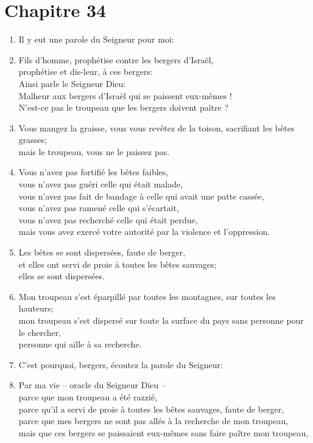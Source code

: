 \documentclass[12pt,a4paper,titlepage]{article}
\def \pslabelsep{0.2em} %
\def \psleftmargin{0em} %
\begin{document}
\section*{Chapitre 34}
\begin{enumerate}[leftmargin=\psleftmargin, labelsep = \pslabelsep, label={\arabic*}, font=\color{\pscolor}\small\textsuperscript, parsep=0em, itemsep=0em, topsep=0em ]
\item Il y eut une parole du Seigneur pour moi:
\item Fils d’homme, prophétise contre les bergers d’Israël, \\ prophétise et dis-leur, à ces bergers: \\ Ainsi parle le Seigneur Dieu: \\ Malheur aux bergers d’Israël qui se paissent eux-mêmes ! \\ N’est-ce pas le troupeau que les bergers doivent paître ?
\item Vous mangez la graisse, vous vous revêtez de la toison, sacrifiant les bêtes grasses; \\ mais le troupeau, vous ne le paissez pas.
\item Vous n’avez pas fortifié les bêtes faibles, \\ vous n’avez pas guéri celle qui était malade, \\ vous n’avez pas fait de bandage à celle qui avait une patte cassée, \\ vous n’avez pas ramené celle qui s’écartait, \\ vous n’avez pas recherché celle qui était perdue, \\ mais vous avez exercé votre autorité par la violence et l’oppression.
\item Les bêtes se sont dispersées, faute de berger, \\ et elles ont servi de proie à toutes les bêtes sauvages; \\ elles se sont dispersées.
\item Mon troupeau s’est éparpillé par toutes les montagnes, sur toutes les hauteurs; \\ mon troupeau s’est dispersé sur toute la surface du pays sans personne pour le chercher, \\ personne qui aille à sa recherche.
\item C’est pourquoi, bergers, écoutez la parole du Seigneur:
\item Par ma vie – oracle du Seigneur Dieu – \\ parce que mon troupeau a été razzié, \\ parce qu’il a servi de proie à toutes les bêtes sauvages, faute de berger, \\ parce que mes bergers ne sont pas allés à la recherche de mon troupeau, \\ mais que ces bergers se paissaient eux-mêmes sans faire paître mon troupeau,

\end{enumerate}
\end{document}
